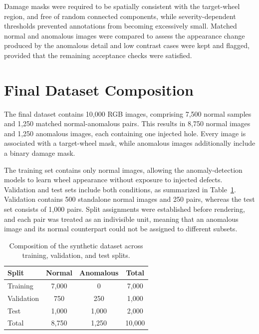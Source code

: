 Damage masks were required to be spatially consistent with the target-wheel region, and free of random connected components, while severity-dependent thresholds prevented annotations from becoming excessively small. Matched normal and anomalous images were compared to assess the appearance change produced by the anomalous detail and low contrast cases were kept and flagged, provided that the remaining acceptance checks were satisfied.

\section{Final Dataset Composition}
\label{sec:final-synthetic-dataset}

The final dataset contains 10,000 RGB images, comprising 7,500 normal samples and 1,250 matched normal-anomalous pairs. This results in 8,750 normal images and 1,250 anomalous images, each containing one injected hole. Every image is associated with a target-wheel mask, while anomalous images additionally include a binary damage mask.

The training set contains only normal images, allowing the anomaly-detection models to learn wheel appearance without exposure to injected defects. Validation and test sets include both conditions, as summarized in Table~\ref{tab:synthetic-dataset-splits}. Validation contains 500 standalone normal images and 250 pairs, whereas the test set consists of 1,000 pairs. Split assignments were established before rendering, and each pair was treated as an indivisible unit, meaning that an anomalous image and its normal counterpart could not be assigned to different subsets.

\begin{table}[ht!]
    \centering
    \begin{tabular}{@{}l c c c@{}}
        \toprule
        \textbf{Split} & \textbf{Normal} & \textbf{Anomalous} & \textbf{Total} \\
        \midrule
        \midrule
        Training       & 7,000           & 0                  & 7,000          \\
        Validation     & 750             & 250                & 1,000          \\
        Test           & 1,000           & 1,000              & 2,000          \\
        \midrule
        Total          & 8,750           & 1,250              & 10,000         \\
        \bottomrule
    \end{tabular}
    \vspace{5mm}
    \caption{Composition of the synthetic dataset across training, validation, and test splits.}
    \label{tab:synthetic-dataset-splits}
\end{table}

